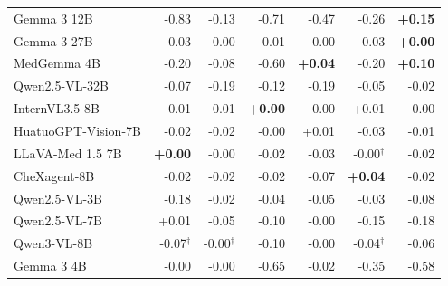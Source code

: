 \begin{table}[t]
{\begin{tabular}{lrrrrrr}
Gemma 3 12B & \cellcolor{cfSlate4}-0.83 & \cellcolor{cfSlate3}-0.13 & \cellcolor{cfSlate4}-0.71 & \cellcolor{cfSlate4}-0.47 & \cellcolor{cfSlate4}-0.26 & \cellcolor{cfTerra3}\textbf{+0.15} \\
Gemma 3 27B & \cellcolor{cfSlate2}-0.03 & \cellcolor{cfSlate1}-0.00 & \cellcolor{cfSlate1}-0.01 & \cellcolor{cfSlate1}-0.00 & \cellcolor{cfSlate2}-0.03 & \cellcolor{cfTerra1}\textbf{+0.00} \\
MedGemma 4B & \cellcolor{cfSlate3}-0.20 & \cellcolor{cfSlate2}-0.08 & \cellcolor{cfSlate4}-0.60 & \cellcolor{cfTerra2}\textbf{+0.04} & \cellcolor{cfSlate3}-0.20 & \cellcolor{cfTerra3}\textbf{+0.10} \\
Qwen2.5-VL-32B & \cellcolor{cfSlate2}-0.07 & \cellcolor{cfSlate3}-0.19 & \cellcolor{cfSlate3}-0.12 & \cellcolor{cfSlate3}-0.19 & \cellcolor{cfSlate2}-0.05 & \cellcolor{cfSlate2}-0.02 \\
InternVL3.5-8B & \cellcolor{cfSlate1}-0.01 & \cellcolor{cfSlate1}-0.01 & \cellcolor{cfTerra1}\textbf{+0.00} & \cellcolor{cfSlate1}-0.00 & \cellcolor{cfTerra1}+0.01 & \cellcolor{cfSlate1}-0.00 \\
HuatuoGPT-Vision-7B & \cellcolor{cfSlate2}-0.02 & \cellcolor{cfSlate1}-0.02 & \cellcolor{cfSlate1}-0.00 & \cellcolor{cfTerra1}+0.01 & \cellcolor{cfSlate2}-0.03 & \cellcolor{cfSlate1}-0.01 \\
LLaVA-Med 1.5 7B & \cellcolor{cfTerra1}\textbf{+0.00} & \cellcolor{cfSlate1}-0.00 & \cellcolor{cfSlate2}-0.02 & \cellcolor{cfSlate2}-0.03 & \cellcolor{cfSlate1}-0.00$^{\dagger}$ & \cellcolor{cfSlate1}-0.02 \\
CheXagent-8B & \cellcolor{cfSlate2}-0.02 & \cellcolor{cfSlate1}-0.02 & \cellcolor{cfSlate2}-0.02 & \cellcolor{cfSlate2}-0.07 & \cellcolor{cfTerra2}\textbf{+0.04} & \cellcolor{cfSlate2}-0.02 \\
Qwen2.5-VL-3B & \cellcolor{cfSlate3}-0.18 & \cellcolor{cfSlate1}-0.02 & \cellcolor{cfSlate2}-0.04 & \cellcolor{cfSlate2}-0.05 & \cellcolor{cfSlate2}-0.03 & \cellcolor{cfSlate2}-0.08 \\
Qwen2.5-VL-7B & \cellcolor{cfTerra1}+0.01 & \cellcolor{cfSlate2}-0.05 & \cellcolor{cfSlate2}-0.10 & \cellcolor{cfSlate1}-0.00 & \cellcolor{cfSlate3}-0.15 & \cellcolor{cfSlate3}-0.18 \\
Qwen3-VL-8B & \cellcolor{cfSlate2}-0.07$^{\dagger}$ & \cellcolor{cfSlate1}-0.00$^{\dagger}$ & \cellcolor{cfSlate2}-0.10 & \cellcolor{cfSlate1}-0.00 & \cellcolor{cfSlate2}-0.04$^{\dagger}$ & \cellcolor{cfSlate2}-0.06 \\
Gemma 3 4B & \cellcolor{cfSlate1}-0.00 & \cellcolor{cfSlate1}-0.00 & \cellcolor{cfSlate4}-0.65 & \cellcolor{cfSlate1}-0.02 & \cellcolor{cfSlate4}-0.35 & \cellcolor{cfSlate4}-0.58 \\

\end{tabular}}
\end{table}
